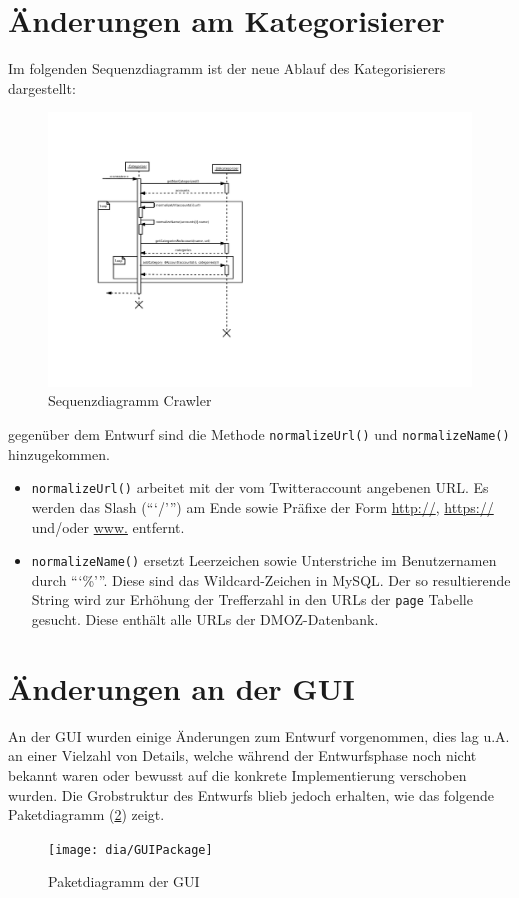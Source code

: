 \section{Änderungen am Kategorisierer}
Im folgenden Sequenzdiagramm ist der neue Ablauf des Kategorisierers dargestellt:
\begin{figure}[H]
	\centering
	\includegraphics[width=\textwidth,height=\textheight,keepaspectratio=true]{dia/categorizerSequence}
	\caption{Sequenzdiagramm Crawler}
	\label{fig:Crawler}
\end{figure}
gegenüber dem Entwurf sind die Methode \lstinline{normalizeUrl()} und \lstinline{normalizeName()} hinzugekommen.
\begin{itemize}
	\item \lstinline{normalizeUrl()} arbeitet mit der vom Twitteraccount angebenen URL. Es werden das Slash (```/''') am Ende sowie Präfixe der Form \url{http://}, \url{https://} und/oder \url{www.} entfernt.
	\item \lstinline{normalizeName()} ersetzt Leerzeichen sowie Unterstriche im Benutzernamen durch ```\%'''. Diese sind das Wildcard-Zeichen in MySQL. Der so resultierende String wird zur Erhöhung der Trefferzahl in den URLs der \lstinline{page} Tabelle gesucht. Diese enthält alle URLs der DMOZ-Datenbank.
\end{itemize}

\section{Änderungen an der GUI}
An der GUI wurden einige Änderungen zum Entwurf vorgenommen, dies lag u.A. an einer Vielzahl von Details, welche während der Entwurfsphase noch nicht bekannt waren oder bewusst auf die konkrete Implementierung verschoben wurden. 
Die Grobstruktur des Entwurfs blieb jedoch erhalten, wie das folgende Paketdiagramm (\ref{fig:GUI}) zeigt.
\begin{figure}[h!]
	\centering
	\texttt{[image: dia/GUIPackage]}
	\caption{Paketdiagramm der GUI}
	\label{fig:GUI}
\end{figure}

